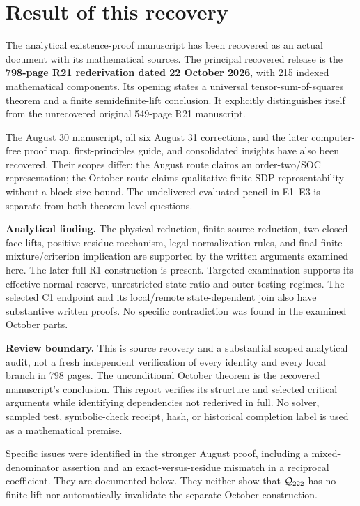 \section*{Result of this recovery}
The analytical existence-proof manuscript has been recovered as an actual
document with its mathematical sources. The principal recovered release is
the \textbf{798-page R21 rederivation dated 22 October 2026}, with
215 indexed mathematical components. Its opening states a universal
tensor-sum-of-squares theorem and a finite semidefinite-lift conclusion.
It explicitly distinguishes itself from the unrecovered original
549-page R21 manuscript.

The August 30 manuscript, all six August 31 corrections, and the later
computer-free proof map, first-principles guide, and consolidated insights
have also been recovered. Their scopes differ: the August route claims
an order-two/SOC representation; the October route claims qualitative
finite SDP representability without a block-size bound. The undelivered
evaluated pencil in E1--E3 is separate from both theorem-level questions.

\textbf{Analytical finding.}
The physical reduction, finite source reduction, two closed-face lifts,
positive-residue mechanism, legal normalization rules, and final finite
mixture/criterion implication are supported by the written arguments
examined here. The later full R1 construction is present. Targeted
examination supports its effective normal reserve, unrestricted state
ratio and outer testing regimes. The selected C1 endpoint and its
local/remote state-dependent join also have substantive written proofs.
No specific contradiction was found in the examined October parts.

\textbf{Review boundary.}
This is source recovery and a substantial scoped analytical audit,
not a fresh independent verification of every identity and every local
branch in 798 pages. The unconditional October theorem is the recovered
manuscript's conclusion. This report verifies its structure and selected
critical arguments while identifying dependencies not rederived in full.
No solver, sampled test, symbolic-check receipt, hash, or historical
completion label is used as a mathematical premise.

Specific issues were identified in the stronger August proof, including
a mixed-denominator assertion and an exact-versus-residue mismatch in a
reciprocal coefficient. They are documented below. They neither show
that \(\mathcal Q_{222}\) has no finite lift nor automatically invalidate the separate
October construction.

